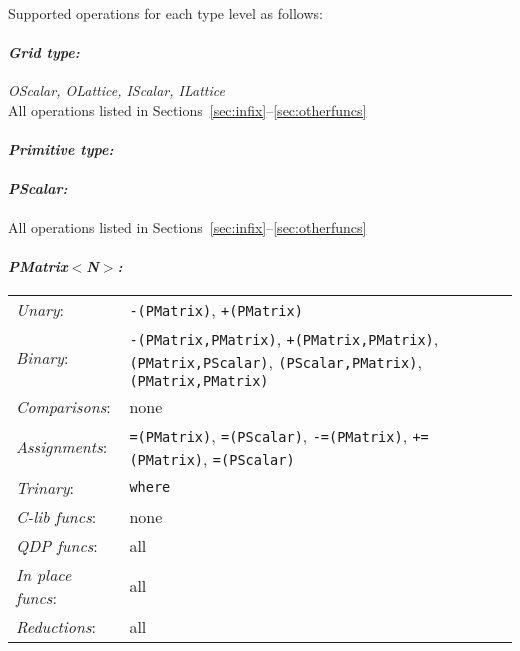 \documentclass[12pt,letterpaper]{article}
\begin{document}
\noindent
Supported operations for each type level as follows:

\paragraph{\bf\em Grid type:} {\em OScalar, OLattice, IScalar, ILattice}\\
All operations listed in Sections~\ref{sec:infix}--\ref{sec:otherfuncs}

\paragraph{\bf\em Primitive type:}
\paragraph{\bf\em PScalar:}
All operations listed in Sections~\ref{sec:infix}--\ref{sec:otherfuncs}

\paragraph{\bf\em PMatrix$<$N$>$:}
\begin{flushleft}
  \begin{tabular}{lp{5.0in}}
  {\em Unary}:& {\tt -(PMatrix)}, {\tt +(PMatrix)}\\
  {\em Binary}:& {\tt -(PMatrix,PMatrix)}, {\tt +(PMatrix,PMatrix)}, 
       {\tt *(PMatrix,PScalar)}, {\tt *(PScalar,PMatrix)}, {\tt *(PMatrix,PMatrix)}\\
  {\em Comparisons}:& none\\
  {\em Assignments}:& {\tt =(PMatrix)}, {\tt =(PScalar)}, {\tt -=(PMatrix)}, 
       {\tt +=(PMatrix)}, {\tt *=(PScalar)}\\
  {\em Trinary}:& {\tt where}\\
  {\em C-lib funcs}:& none\\
  {\em QDP funcs}:& all\\
  {\em In place funcs}:& all\\
  {\em Reductions}:& all\\
  \end{tabular}
\end{flushleft}

\end{document}
